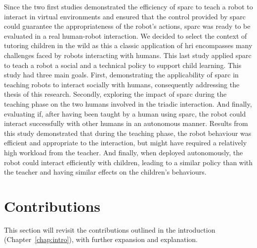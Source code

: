 Since the two first studies demonstrated the efficiency of \gls{sparc} to teach a robot to interact in virtual environments and ensured that the control provided by \gls{sparc} could guarantee the appropriateness of the robot's actions, \gls{sparc} was ready to be evaluated in a real human-robot interaction. We decided to select the context of tutoring children in the wild as this a classic application of \gls{hri} encompasses many challenges faced by robots interacting with humans. This last study applied \gls{sparc} to teach a robot a social and a technical policy to support child learning. This study had three main goals. First, demonstrating the applicability of \gls{sparc} in teaching robots to interact socially with humans, consequently addressing the thesis of this research. Secondly, exploring the impact of \gls{sparc} during the teaching phase on the two humans involved in the triadic interaction. And finally, evaluating if, after having been taught by a human using \gls{sparc}, the robot could interact successfully with other humans in an autonomous manner. Results from this study demonstrated that during the teaching phase, the robot behaviour was efficient and appropriate to the interaction, but might have required a relatively high workload from the teacher. And finally, when deployed autonomously, the robot could interact efficiently with children, leading to a similar policy than with the teacher and having similar effects on the children's behaviours.

\section{Contributions}\label{sec:conc_contribution}
This section will revisit the contributions outlined in the introduction (Chapter~\ref{chap:intro}), with further expansion and explanation. 

